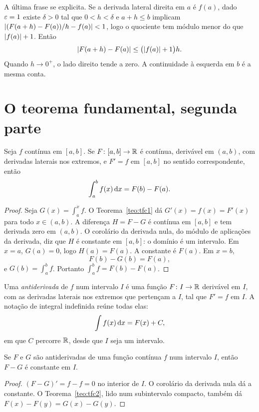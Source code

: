 \documentclass[11pt,a4paper]{article}
\begin{document}
A última frase se explicita. Se a derivada lateral direita em $a$ é $f(a)$, dado $\varepsilon=1$ existe $\delta>0$ tal que $0<h<\delta$ e $a+h\le b$ implicam $\left\lvert (F(a+h)-F(a))/h-f(a) \right\rvert<1$, logo o quociente tem módulo menor do que $\left\lvert f(a) \right\rvert+1$. Então
\[
\left\lvert F(a+h)-F(a) \right\rvert\le\bigl(\left\lvert f(a) \right\rvert+1\bigr)h.
\]
Quando $h\to 0^+$, o lado direito tende a zero. A continuidade à esquerda em $b$ é a mesma conta.

\section{O teorema fundamental, segunda parte}

\begin{teorema}\label{teo:tfc2}
Seja $f$ contínua em $[a,b]$. Se $F\colon[a,b]\to\mathbb{R}$ é contínua, derivável em $(a,b)$, com derivadas laterais nos extremos, e $F'=f$ em $[a,b]$ no sentido correspondente, então
\[
\int_a^b f(x)\,\mathrm{d} x=F(b)-F(a).
\]
\end{teorema}

\begin{proof}
Seja $G(x)=\int_a^x f$. O Teorema~\ref{teo:tfc1} dá $G'(x)=f(x)=F'(x)$ para todo $x\in(a,b)$. A diferença $H=F-G$ é contínua em $[a,b]$ e tem derivada zero em $(a,b)$. O corolário da derivada nula, do módulo de aplicações da derivada, diz que $H$ é constante em $[a,b]$: o domínio é um intervalo. Em $x=a$, $G(a)=0$, logo $H(a)=F(a)$. A constante é $F(a)$. Em $x=b$,
\[
F(b)-G(b)=F(a),
\]
e $G(b)=\int_a^b f$. Portanto $\int_a^b f=F(b)-F(a)$.
\end{proof}

\begin{definicao}
Uma \emph{antiderivada} de $f$ num intervalo $I$ é uma função $F\colon I\to\mathbb{R}$ derivável em $I$, com as derivadas laterais nos extremos que pertençam a $I$, tal que $F'=f$ em $I$. A notação de integral indefinida reúne todas elas:
\[
\int f(x)\,\mathrm{d} x=F(x)+C,
\]
em que $C$ percorre $\mathbb{R}$, desde que $I$ seja um intervalo.
\end{definicao}

\begin{corolario}
Se $F$ e $G$ são antiderivadas de uma função contínua $f$ num intervalo $I$, então $F-G$ é constante em $I$.
\end{corolario}

\begin{proof}
$(F-G)'=f-f=0$ no interior de $I$. O corolário da derivada nula dá a constante. O Teorema~\ref{teo:tfc2}, lido num subintervalo compacto, também dá $F(x)-F(y)=G(x)-G(y)$.
\end{proof}
\end{document}
